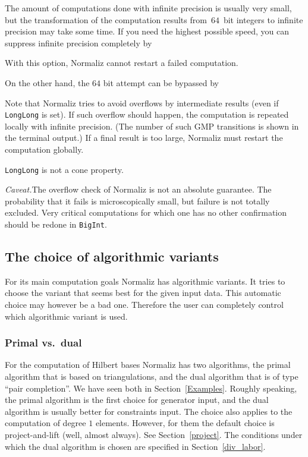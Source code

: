 The amount of computations done with infinite precision is usually very small, but the transformation of the computation results from~$64$~bit integers to infinite precision may take some time. If you need the highest possible speed, you can suppress infinite precision completely by
\begin{itemize}
	\itemtt[LongLong]
\end{itemize}
With this option, Normaliz cannot restart a failed computation.

On the other hand, the $64$ bit attempt can be bypassed by
\begin{itemize}
	\itemtt[BigInt, -B]
\end{itemize}

Note that Normaliz tries to avoid overflows by intermediate results (even if \verb|LongLong| is set). If such overflow should happen, the computation is repeated locally with infinite precision. (The number of such GMP transitions is shown in the terminal output.) If a final result is too large, Normaliz must restart the computation globally.

\verb|LongLong| is not a cone property.

\emph{Caveat.}\enspace The overflow check of Normaliz is not an absolute guarantee. The probability that it fails is microscopically small, but failure is not totally excluded. Very critical computations for which one has no other confirmation should be redone in \verb|BigInt|.


\subsection{The choice of algorithmic variants}

For its main computation goals Normaliz has algorithmic variants. It tries to choose the variant that seems best for the given input data. This automatic choice may however be a bad one. Therefore the user can completely control which algorithmic variant is used.

\subsubsection{Primal vs.\ dual}

For the computation of Hilbert bases Normaliz has two algorithms, the primal algorithm that is based on triangulations, and the dual algorithm that is of type ``pair completion''. We have seen both in Section~\ref{Examples}. Roughly speaking, the primal algorithm is the first choice for generator input, and the dual algorithm is usually better for constraints input. The choice also applies to the computation of degree $1$ elements. However, for them the default choice is project-and-lift (well, almost always). See Section~\ref{project}. The conditions under which the dual algorithm is chosen are specified in Section~\ref{div_labor}.


